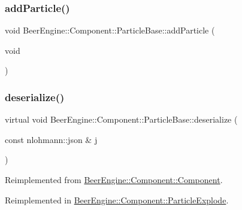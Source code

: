 \subsubsection{\texorpdfstring{add\+Particle()}{addParticle()}}
{\footnotesize\ttfamily void Beer\+Engine\+::\+Component\+::\+Particle\+Base\+::add\+Particle (\begin{DoxyParamCaption}\item[{void}]{ }\end{DoxyParamCaption})\hspace{0.3cm}{\ttfamily [protected]}}

\mbox{\label{class_beer_engine_1_1_component_1_1_particle_base_a227b7fe0edab6df4b6c15f4b22bed7ae}} 
\subsubsection{\texorpdfstring{deserialize()}{deserialize()}}
{\footnotesize\ttfamily virtual void Beer\+Engine\+::\+Component\+::\+Particle\+Base\+::deserialize (\begin{DoxyParamCaption}\item[{const nlohmann\+::json \&}]{j }\end{DoxyParamCaption})\hspace{0.3cm}{\ttfamily [virtual]}}



Reimplemented from \mbox{\hyperlink{class_beer_engine_1_1_component_1_1_component_a044d30f65879a1467f44aa3eb8ad7bce}{Beer\+Engine\+::\+Component\+::\+Component}}.



Reimplemented in \mbox{\hyperlink{class_beer_engine_1_1_component_1_1_particle_explode_ad79e74129dd1cd7f20e0575a9ffdffc3}{Beer\+Engine\+::\+Component\+::\+Particle\+Explode}}.

\mbox{\label{class_beer_engine_1_1_component_1_1_particle_base_a17d41a2cdf9174d5f86a6773c40e4d28}} 
